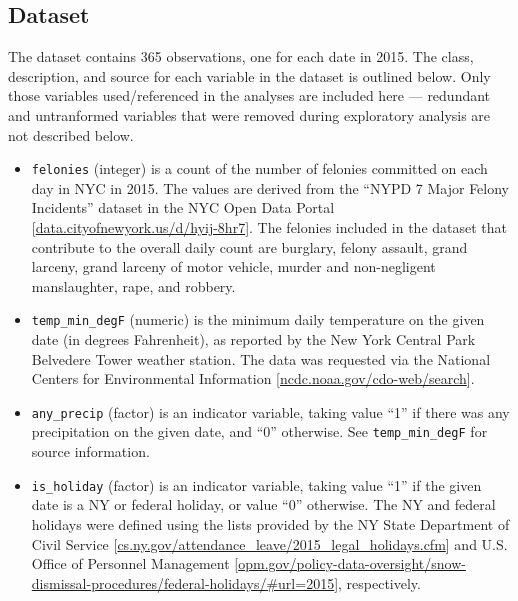 \documentclass[11pt,notitlepage]{article}
\begin{document}
\subsection{Dataset}
\label{sec:dataset}

The dataset contains 365 observations, one for each date in 2015. The class, description, and source for each variable in the dataset is outlined below. Only those variables used/referenced in the analyses are included here --- redundant and untranformed variables that were removed during exploratory analysis are not described below.

\begin{itemize}
\setlength\itemsep{-3pt}
\vspace*{-3mm}
	
\item \texttt{felonies} (integer) is a count of the number of felonies committed on each day in NYC in 2015. The values are derived from the ``NYPD 7 Major Felony Incidents'' dataset in the NYC Open Data Portal [\href{https://data.cityofnewyork.us/Public-Safety/NYPD-7-Major-Felony-Incidents/hyij-8hr7}{data.cityofnewyork.us/d/hyij-8hr7}]. The felonies included in the dataset that contribute to the overall daily count are burglary, felony assault, grand larceny, grand larceny of motor vehicle, murder and non-negligent manslaughter, rape, and robbery.

\item \texttt{temp_min_degF} (numeric) is the minimum daily temperature on the given date (in degrees Fahrenheit), as reported by the New York Central Park Belvedere Tower weather station. The data was requested via the National Centers for Environmental Information [\href{http://www.ncdc.noaa.gov/cdo-web/search}{ncdc.noaa.gov/cdo-web/search}].


\item \texttt{any_precip} (factor) is an indicator variable, taking value ``1'' if there was any precipitation on the given date, and ``0'' otherwise. See \texttt{temp_min_degF} for source information.


\item \texttt{is_holiday} (factor) is an indicator variable, taking value ``1'' if the given date is a NY or federal holiday, or value ``0'' otherwise. The NY and federal holidays were defined using the lists provided by the NY State Department of Civil Service [\href{https://www.cs.ny.gov/attendance_leave/2015_legal_holidays.cfm}{cs.ny.gov/attendance_leave/2015_legal_holidays.cfm}] and U.S. Office of Personnel Management [\href{https://www.opm.gov/policy-data-oversight/snow-dismissal-procedures/federal-holidays/\#url=2015}{opm.gov/policy-data-oversight/snow-dismissal-procedures/federal-holidays/\#url=2015}], respectively.



\end{itemize}
\end{document}
